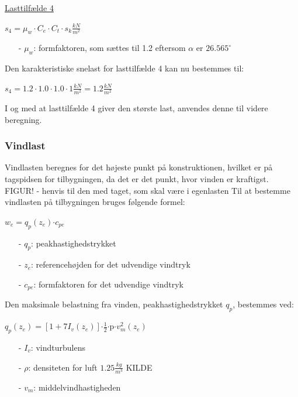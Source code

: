 \underline{Lasttilfælde 4}
\begin{center}
	$s_4=\mu_w\cdot C_e\cdot C_t\cdot s_k \frac{kN}{m^2}$
\end{center}
\begin{itemize}
	\item[-] $\mu_w$: formfaktoren, som sættes til 1.2 eftersom $\alpha$ er $26.565^{\circ}$ \citep[ kapitel 5.3.3]{EU91}
\end{itemize}
Den karakteristiske snelast for lasttilfælde 4 kan nu bestemmes til:
\begin{center}
	$s_4=1.2\cdot 1.0\cdot 1.0\cdot 1 \frac{kN}{m^2}=1.2 \frac{kN}{m^2}$
\end{center}
I og med at lasttilfælde 4 giver den største last, anvendes denne til videre beregning.

\subsubsection{Vindlast}
Vindlasten beregnes for det højeste punkt på konstruktionen, hvilket er på tagspidsen for tilbygningen, da det er det punkt, hvor vinden er kraftigst.
\newline
\newline
FIGUR! - henvis til den med taget, som skal være i egenlasten
\newline
\newline
Til at bestemme vindlasten på tilbygningen bruges følgende formel:	
\begin{center} $w_e=q_p(z_e)$$\cdot$$c_{pe}$
\end{center}
\begin{itemize}
	\item[-] $q_p$: peakhastighedstrykket
	\item[-] $z_e$: referencehøjden for det udvendige vindtryk
	\item[-] $c_{pe}$: formfaktoren for det udvendige vindtryk
\end{itemize}
Den maksimale belastning fra vinden, peakhastighedstrykket $q_p$, bestemmes ved:
\begin{center}
$q_p(z_e)=[1+7I_v(z_e)]$$\cdot$$\frac{1}{2}$$\cdot$p$\cdot$$v_m^2(z_e)$
\end{center}
\begin{itemize}
	\item[-] $I_v$: vindturbulens
	\item[-] $\rho$: densiteten for luft $1.25 \frac{kg}{m^3}$ KILDE
	\item[-] $v_m$: middelvindhastigheden
\end{itemize}
